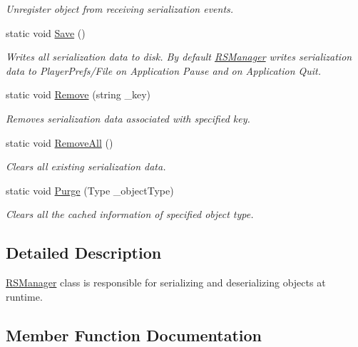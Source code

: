 \begin{DoxyCompactItemize}
\begin{DoxyCompactList}\small\item\em Unregister object from receiving serialization events. \end{DoxyCompactList}\item 
static void \hyperlink{class_r_s_manager_a93ae17b65d2a85ee2ad86ffb69107301}{Save} ()
\begin{DoxyCompactList}\small\item\em Writes all serialization data to disk. By default \hyperlink{class_r_s_manager}{R\+S\+Manager} writes serialization data to Player\+Prefs/\+File on Application Pause and on Application Quit. \end{DoxyCompactList}\item 
static void \hyperlink{class_r_s_manager_aa4aae89f01d20407c26a3f568932a3db}{Remove} (string \+\_\+key)
\begin{DoxyCompactList}\small\item\em Removes serialization data associated with specified key. \end{DoxyCompactList}\item 
static void \hyperlink{class_r_s_manager_ae181b60d8c24114b8c417b74a51bff12}{Remove\+All} ()
\begin{DoxyCompactList}\small\item\em Clears all existing serialization data. \end{DoxyCompactList}\item 
static void \hyperlink{class_r_s_manager_a4535a66d6e679c4b1f3a5d0488159eac}{Purge} (Type \+\_\+object\+Type)
\begin{DoxyCompactList}\small\item\em Clears all the cached information of specified object type. \end{DoxyCompactList}\end{DoxyCompactItemize}


\subsection{Detailed Description}
\hyperlink{class_r_s_manager}{R\+S\+Manager} class is responsible for serializing and deserializing objects at runtime. 



\subsection{Member Function Documentation}
\hypertarget{class_r_s_manager_a8f9e0f48f1659ab548f840b344302815}{}
